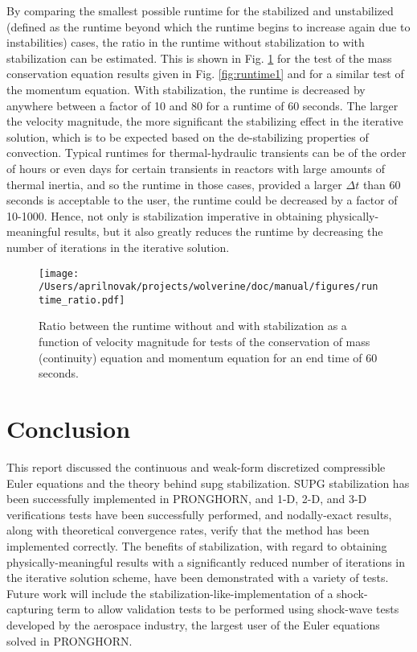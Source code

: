 \documentclass[10pt]{article}
\numberwithin{equation}{section} %
\begin{document}
By comparing the smallest possible runtime for the stabilized and unstabilized (defined as the runtime beyond which the runtime begins to increase again due to instabilities) cases, the ratio in the runtime without stabilization to with stabilization can be estimated. This is shown in Fig. \ref{fig:runtime2} for the test of the mass conservation equation results given in Fig. \ref{fig:runtime1} and for a similar test of the momentum equation. With stabilization, the runtime is decreased by anywhere between a factor of 10 and 80 for a runtime of 60 seconds. The larger the velocity magnitude, the more significant the stabilizing effect in the iterative solution, which is to be expected based on the de-stabilizing properties of convection. Typical runtimes for thermal-hydraulic transients can be of the order of hours or even days for certain transients in reactors with large amounts of thermal inertia, and so the runtime in those cases, provided a larger \(\Delta t\) than 60 seconds is acceptable to the user, the runtime could be decreased by a factor of 10-1000. Hence, not only is stabilization imperative in obtaining physically-meaningful results, but it also greatly reduces the runtime by decreasing the number of iterations in the iterative solution.

 \begin{figure}[H]
  \centering
  \texttt{[image: /Users/aprilnovak/projects/wolverine/doc/manual/figures/runtime\_ratio.pdf]}
  \caption{Ratio between the runtime without and with stabilization as a function of velocity magnitude for tests of the conservation of mass (continuity) equation and momentum equation for an end time of 60 seconds.}
  \label{fig:runtime2}
\end{figure}


\section{Conclusion}

This report discussed the continuous and weak-form discretized compressible Euler equations and the theory behind \gls{supg} stabilization. SUPG stabilization has been successfully implemented in PRONGHORN, and 1-D, 2-D, and 3-D verifications tests have been successfully performed, and nodally-exact results, along with theoretical convergence rates, verify that the method has been implemented correctly. The benefits of stabilization, with regard to obtaining physically-meaningful results with a significantly reduced number of iterations in the iterative solution scheme, have been demonstrated with a variety of tests. Future work will include the stabilization-like-implementation of a shock-capturing term to allow validation tests to be performed using shock-wave tests developed by the aerospace industry, the largest user of the Euler equations solved in PRONGHORN. 
\end{document}
